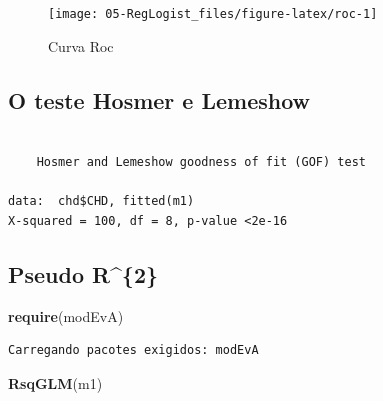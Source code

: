 \documentclass[12pt,brazil,oneside]{book}
\newenvironment{Shaded}{\begin{snugshade}}{\end{snugshade}}
\newcommand{\DataTypeTok}[1]{\textcolor[rgb]{0.13,0.29,0.53}{#1}}
\newcommand{\DecValTok}[1]{\textcolor[rgb]{0.00,0.00,0.81}{#1}}
\newcommand{\KeywordTok}[1]{\textcolor[rgb]{0.13,0.29,0.53}{\textbf{#1}}}
\newcommand{\NormalTok}[1]{#1}
\newcommand{\OperatorTok}[1]{\textcolor[rgb]{0.81,0.36,0.00}{\textbf{#1}}}
\begin{document}
\begin{figure}[h]

{\centering \texttt{[image: 05-RegLogist\_files/figure-latex/roc-1]} 

}

\caption{Curva Roc}\label{fig:roc}
\end{figure}

\hypertarget{o-teste-hosmer-e-lemeshow}{%
\subsection{O teste Hosmer e Lemeshow}\label{o-teste-hosmer-e-lemeshow}}

\begin{Shaded}
\end{Shaded}

\begin{verbatim}

    Hosmer and Lemeshow goodness of fit (GOF) test

data:  chd$CHD, fitted(m1)
X-squared = 100, df = 8, p-value <2e-16
\end{verbatim}

\hypertarget{pseudo-r2}{%
\subsection{Pseudo R\^{}\{2\}}\label{pseudo-r2}}

\begin{Shaded}
\begin{Highlighting}[]
\KeywordTok{require}\NormalTok{(modEvA)}
\end{Highlighting}
\end{Shaded}

\begin{verbatim}
Carregando pacotes exigidos: modEvA
\end{verbatim}

\begin{Shaded}
\begin{Highlighting}[]
\KeywordTok{RsqGLM}\NormalTok{(m1)}
\end{Highlighting}
\end{Shaded}
\end{document}
